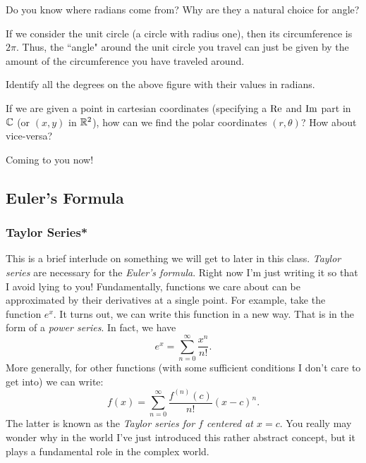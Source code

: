 \begin{question}
        Do you know where radians come from? Why are they a natural choice for angle?
\end{question}

\begin{answer}
    If we consider the unit circle (a circle with radius one), then its circumference is $2\pi$. Thus, the ``angle" around the unit circle you travel can just be given by the amount of the circumference you have traveled around.
\end{answer}

\begin{exercise}
Identify all the degrees on the above figure with their values in radians.
\end{exercise}

\begin{question}
        If we are given a point in cartesian coordinates (specifying a $\mathrm{Re}$ and $\mathrm{Im}$ part in $\mathbb{C}$ (or $(x,y)$ in $\mathbb{R}^2$), how can we find the polar coordinates $(r, \theta)$? How about vice-versa?
\end{question}
        
        \begin{answer}
            Coming to you now!
        \end{answer}
        
        \subsection{Euler's Formula}
        
        \subsubsection{Taylor Series*}
        This is a brief interlude on something we will get to later in this class.  \emph{Taylor series} are necessary for the \emph{Euler's formula}. Right now I'm just writing it so that I avoid lying to you! Fundamentally, functions we care about can be approximated by their derivatives at a single point. For example, take the function $e^x$.  It turns out, we can write this function in a new way.  That is in the form of a \emph{power series}. In fact, we have 
        \[
        e^x = \sum_{n=0}^\infty \frac{x^n}{n!}.
        \]
        More generally, for other functions (with some sufficient conditions I don't care to get into) we can write:
        \[
        f(x)=\sum_{n=0}^\infty \frac{f^{(n)}(c)}{n!}(x-c)^n.
        \]
        The latter is known as the \emph{Taylor series for $f$ centered at $x=c$}. You really may wonder why in the world I've just introduced this rather abstract concept, but it plays a fundamental role in the complex world.
        
